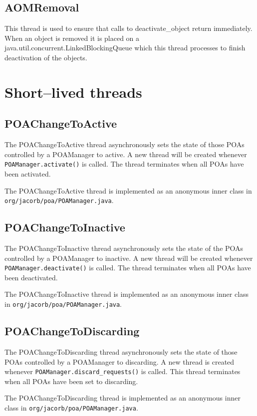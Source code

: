 \subsection*{AOMRemoval}
This thread is used to ensure that calls to deactivate\_object return
immediately. When an object is removed it is placed on a java.util.concurrent.LinkedBlockingQueue
which this thread processes to finish deactivation of the objects.

\section*{Short--lived threads}

\subsection*{POAChangeToActive}
The POAChangeToActive thread asynchronously sets the state of those POAs
controlled by a POAManager to active. A new thread will be created whenever
{\tt POAManager.activate()} is called. The thread terminates when all POAs
have been activated.

The POAChangeToActive thread is implemented as an anonymous inner class in
{\tt org/jacorb/poa/POAManager.java}.

\subsection*{POAChangeToInactive}
The POAChangeToInactive thread asynchronously sets the state of the POAs
controlled by a POAManager to inactive. A new thread will be created whenever
{\tt POAManager.deactivate()} is called. The thread terminates when all
POAs have been deactivated.

The POAChangeToInactive thread is implemented as an anonymous inner class in
{\tt org/jacorb/poa/POAManager.java}.

\subsection*{POAChangeToDiscarding}
The POAChangeToDiscarding thread asynchronously sets the state of those POAs
controlled by a POAManager to discarding. A new thread is created whenever
{\tt POAManager.discard\_requests()} is called. This thread terminates when
all POAs have been set to discarding.

The POAChangeToDiscarding thread is implemented as an anonymous inner class in
{\tt org/jacorb/poa/POAManager.java}.

